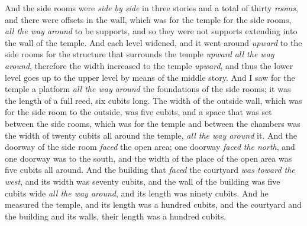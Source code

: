 \begin{biblechapter}
\verse And the side rooms were \textit{side by side} in three stories and a total of thirty \textit{rooms}, and there were offsets in the wall, which was for the temple for the side rooms, \textit{all the way around} to be supports, and so they were not supports extending into the wall of the temple.
\verse And each level widened, and it went around \textit{upward} to the side rooms for the structure that surrounds the temple \textit{upward} \textit{all the way around}, therefore the width increased to the temple \textit{upward}, and thus the lower level goes up to the upper level by means of the middle story.
\verse And I saw for the temple a platform \textit{all the way around} the foundations of the side rooms; it was the length of a full reed, six cubits long.
\verse The width of the outside wall, which was for the side room to the outside, was five cubits, and a space that was set between the side rooms, which was for the temple
\verse and between the chambers was the width of twenty cubits all around the temple, \textit{all the way around} it.
\verse And the doorway of the side room \textit{faced} the open area; one doorway \textit{faced} \textit{the north}, and one doorway was to the south, and the width of the place of the open area was five cubits all around.
\verse And the building that \textit{faced} the courtyard \textit{was toward the west}, and its width was seventy cubits, and the wall of the building was five cubits wide \textit{all the way around}, and its length was ninety cubits.
\verse And he measured the temple, and its length was a hundred cubits, and the courtyard and the building and its walls, their length was a hundred cubits.

\end{biblechapter}

